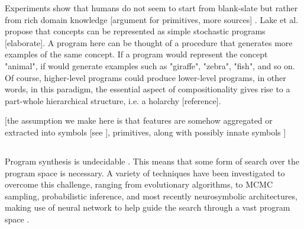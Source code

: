 Experiments show that humans do not seem to start from blank-slate but rather from rich domain knowledge [argument for primitives, more sources] \cite{lake_building_2016}. Lake et al. propose that concepts can be represented as simple stochastic programs [elaborate]. A program here can be thought of a procedure that generates more examples of the same concept. If a program would represent the concept "animal", if would generate examples such as "giraffe", "zebra", "fish", and so on. Of course, higher-level programs could produce lower-level programs, in other words, in this paradigm, the essential aspect of compositionality gives rise to a part-whole hierarchical structure, i.e. a holarchy [reference].





[the assumption we make here is that features are somehow aggregated or extracted into symbols [see \cite{garcez_neurosymbolic_2020}], primitives, along with possibly innate symbols \cite{Lake_Ullman_Tenenbaum_Gershman_2017}] 

















\subsection{}
\subsubsection{}


Program synthesis is undecidable \cite{gulwani_program_2017}. This means that some form of search over the program space is necessary.
A variety of techniques have been investigated to overcome this challenge, ranging from evolutionary algorithms, to MCMC sampling, probabilistic inference, and most recently neurosymbolic architectures, making use of neural network to help guide the search through a vast program space \cite{gulwani_program_2017, ullman_theory_2012}.


